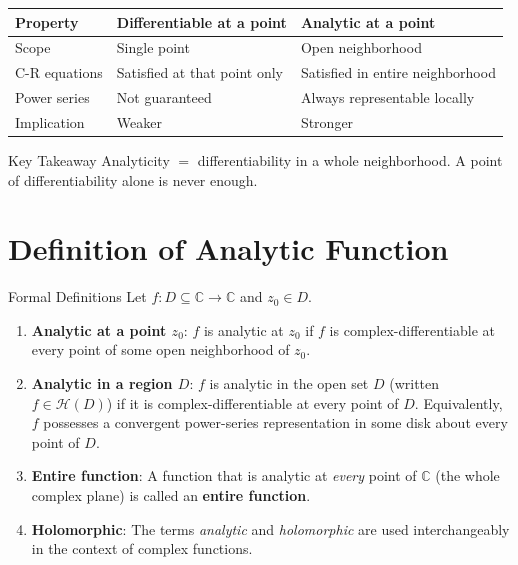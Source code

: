 \documentclass[12pt,a4paper]{article}
\begin{document}
\begin{center}
\begin{tabular}{lll}
\toprule
\textbf{Property} & \textbf{Differentiable at a point} & \textbf{Analytic at a point} \\
\midrule
Scope & Single point & Open neighborhood \\
C-R equations & Satisfied at that point only & Satisfied in entire neighborhood \\
Power series & Not guaranteed & Always representable locally \\
Implication & Weaker & Stronger \\
\bottomrule
\end{tabular}
\end{center}

\begin{learnbox}{Key Takeaway}
Analyticity $=$ differentiability in a whole neighborhood. A point of differentiability alone is never enough.
\end{learnbox}

\section{Definition of Analytic Function}

\begin{infobox}{Formal Definitions}
Let $f : D \subseteq \mathbb{C} \to \mathbb{C}$ and $z_0 \in D$.

\begin{enumerate}
  \item \textbf{Analytic at a point $z_0$}: $f$ is analytic at $z_0$ if $f$ is
        complex-differentiable at every point of some open neighborhood of $z_0$.

  \item \textbf{Analytic in a region $D$}: $f$ is analytic in the open set $D$
        (written $f \in \mathcal{H}(D)$) if it is complex-differentiable at every
        point of $D$.  Equivalently, $f$ possesses a convergent power-series
        representation in some disk about every point of $D$.

  \item \textbf{Entire function}: A function that is analytic at \emph{every}
        point of $\mathbb{C}$ (the whole complex plane) is called an
        \textbf{entire function}.

  \item \textbf{Holomorphic}: The terms \emph{analytic} and \emph{holomorphic}
        are used interchangeably in the context of complex functions.
\end{enumerate}
\end{infobox}
\end{document}
